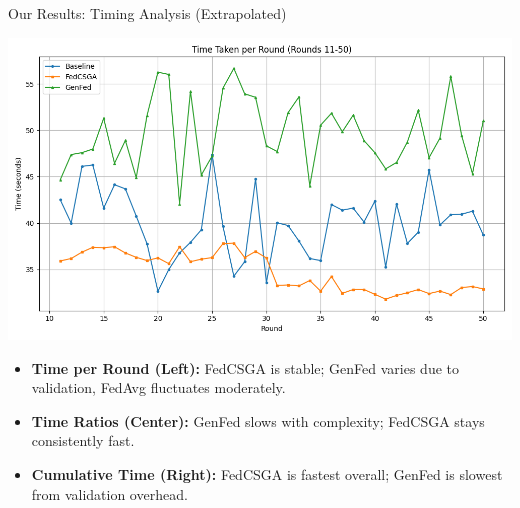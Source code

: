 \documentclass{beamer}
\begin{document}
\begin{frame}{Our Results: Timing Analysis (Extrapolated)}
\begin{center}
\includegraphics[width=\textwidth,height=0.45\textheight,keepaspectratio]{timing_plot.png}
\end{center}
\begin{itemize}
    \item \textbf{Time per Round (Left):} FedCSGA is stable; GenFed varies due to validation, FedAvg fluctuates moderately.
    \item \textbf{Time Ratios (Center):} GenFed slows with complexity; FedCSGA stays consistently fast.
    \item \textbf{Cumulative Time (Right):} FedCSGA is fastest overall; GenFed is slowest from validation overhead.
\end{itemize}

\end{frame}
\end{document}
